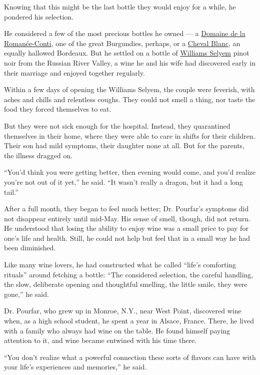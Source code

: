 Knowing that this might be the last bottle they would enjoy for a while,
he pondered his selection.

He considered a few of the most precious bottles he owned --- a
\href{https://www.sothebys.com/en/articles/5-things-to-know-about-domaine-de-la-romanee-conti}{Domaine
de la Romanée-Conti}, one of the great Burgundies, perhaps, or a
\href{https://www.thewinecellarinsider.com/bordeaux-wine-producer-profiles/bordeaux/st-emilion/cheval-blanc/}{Cheval
Blanc}, an equally hallowed Bordeaux. But he settled on a bottle of
\href{http://www.princeofpinot.com/article/851/}{Williams Selyem} pinot
noir from the Russian River Valley, a wine he and his wife had
discovered early in their marriage and enjoyed together regularly.

Within a few days of opening the Williams Selyem, the couple were
feverish, with aches and chills and relentless coughs. They could not
smell a thing, nor taste the food they forced themselves to eat.

But they were not sick enough for the hospital. Instead, they
quarantined themselves in their home, where they were able to care in
shifts for their children. Their son had mild symptoms, their daughter
none at all. But for the parents, the illness dragged on.

``You'd think you were getting better, then evening would come, and
you'd realize you're not out of it yet,'' he said. ``It wasn't really a
dragon, but it had a long tail.''

After a full month, they began to feel much better; Dr. Pourfar's
symptoms did not disappear entirely until mid-May. His sense of smell,
though, did not return. He understood that losing the ability to enjoy
wine was a small price to pay for one's life and health. Still, he could
not help but feel that in a small way he had been diminished.

Like many wine lovers, he had constructed what he called ``life's
comforting rituals'' around fetching a bottle: ``The considered
selection, the careful handling, the slow, deliberate opening and
thoughtful smelling, the little smile, they were gone,'' he said.

Dr. Pourfar, who grew up in Monroe, N.Y., near West Point, discovered
wine when, as a high school student, he spent a year in Alsace, France.
There, he lived with a family who always had wine on the table. He found
himself paying attention to it, and wine became entwined with his time
there.

``You don't realize what a powerful connection these sorts of flavors
can have with your life's experiences and memories,'' he said.

